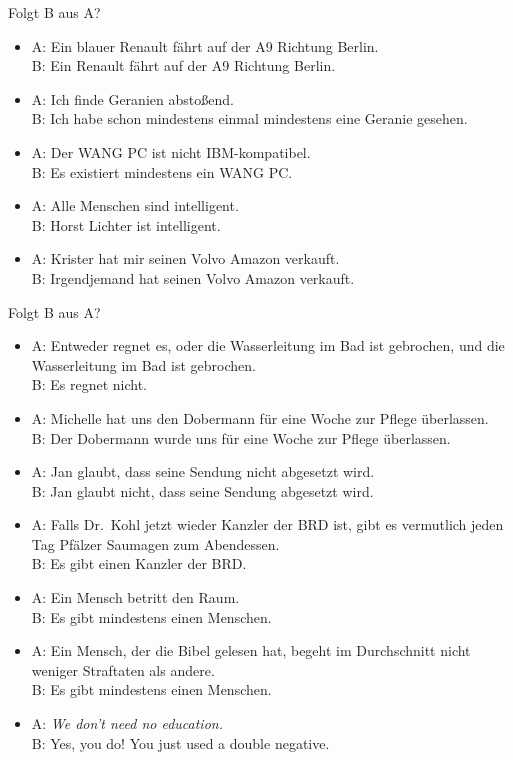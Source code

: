 \begin{frame}
  {Folgt B aus A?} %
  \onslide<+->
  \begin{itemize}[<+->]
    \item A: Ein blauer Renault fährt auf der A9 Richtung Berlin.\\
      \alert{B: Ein Renault fährt auf der A9 Richtung Berlin.}
    \item A: Ich finde Geranien abstoßend.\\
      \alert{B: Ich habe schon mindestens einmal mindestens eine Geranie gesehen.}
    \item A: Der WANG PC ist nicht IBM-kompatibel.\\
      \alert{B: Es existiert mindestens ein WANG PC.}
    \item A: Alle Menschen sind intelligent.\\
      \alert{B: Horst Lichter ist intelligent.}
    \item A: Krister hat mir seinen Volvo Amazon verkauft.\\
      \alert{B: Irgendjemand hat seinen Volvo Amazon verkauft.}
  \end{itemize}
\end{frame}

\begin{frame}
  {Folgt B aus A?} %
  \begin{itemize}[<+->]\small
    \item A: Entweder regnet es, oder die Wasserleitung im Bad ist gebrochen, und die Wasserleitung im Bad ist gebrochen.\\
      \alert{B: Es regnet nicht.}
    \item A: Michelle hat uns den Dobermann für eine Woche zur Pflege überlassen.\\
      \alert{B: Der Dobermann wurde uns für eine Woche zur Pflege überlassen.}
    \item A: Jan glaubt, dass seine Sendung nicht abgesetzt wird.\\
      \alert{B: Jan glaubt nicht, dass seine Sendung abgesetzt wird.}
    \item A: Falls Dr.\ Kohl jetzt wieder Kanzler der BRD ist, gibt es vermutlich jeden Tag Pfälzer Saumagen zum Abendessen.\\
      \alert{B: Es gibt einen Kanzler der BRD.}
    \item A: Ein Mensch betritt den Raum.\\
      \alert{B: Es gibt mindestens einen Menschen.}
    \item A: Ein Mensch, der die Bibel gelesen hat, begeht im Durchschnitt nicht weniger Straftaten als andere.\\
      \alert{B: Es gibt mindestens einen Menschen.}
    \item A: \textit{We don't need no education.}\\
      \alert{B: Yes, you do! You just used a double negative.}
  \end{itemize}
\end{frame}

